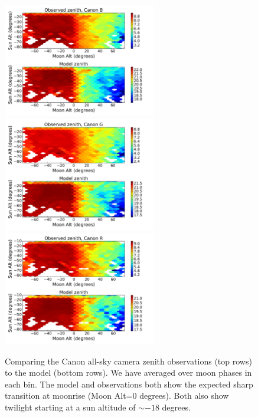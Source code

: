 \documentclass[]{spie}
\begin{document}
\begin{figure}[ht]
  \begin{center}
  \includegraphics[height=5cm]{plots/simple_zenith_comp_B.pdf} 
  \includegraphics[height=5cm]{plots/simple_zenith_comp_G.pdf} 
  \includegraphics[height=5cm]{plots/simple_zenith_comp_R.pdf}
  \end{center}
  \caption{Comparing the Canon all-sky camera zenith observations (top rows) to the model (bottom rows). We have averaged over moon phases in each bin.  The model and observations both show the expected sharp transition at moonrise (Moon Alt=0 degrees).  Both also show twilight starting at a sun altitude of $\sim-18$ degrees.  \label{fig:compareZenithCanon}}
\end{figure}
\end{document}
